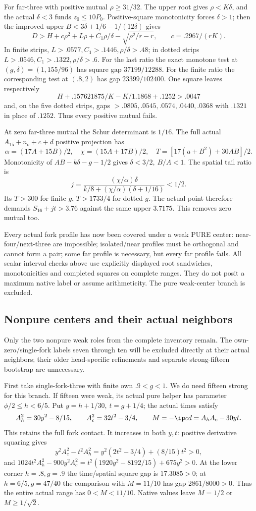 For far-three with positive mutual \(\rho\geq31/32\).
The upper root gives \(\rho<K\delta\), and the actual
\(\delta<3\) funds \(z_0\leq10P_0\).
Positive-square monotonicity forces \(\delta>1\);
then the improved upper
\(B<3\delta+1/6-1/(12\delta)\) gives
\[
 D>H+c\rho^2+L\rho+C_1\rho/\delta-\sqrt{\rho^2/r-r},
 \qquad c=.2967/(rK).
\]
In finite strips, \(L>.0577,C_1>.1446,\rho/\delta>.48\);
in dotted strips \(L>.0546,C_1>.1322,\rho/\delta>.6\).
For the last ratio the exact monotone test at
\((g,\delta)=(1,155/96)\) has square gap \(37199/12288\).
For the finite ratio the corresponding test at \((.8,2)\)
has gap \(23399/102400\).
One square leaves respectively
\[
 H+.157621875/K-K/1.1868+.1252>.0047
\]
and, on the five dotted strips, gaps
\(>.0805,.0545,.0574,.0440,.0368\) with \(.1321\)
in place of \(.1252\).
Thus every positive mutual fails.

At zero far-three mutual the Schur determinant is \(1/16\).
The full actual \(A_{15}+n_o+c+d\) positive projection has
\[
 \alpha=(17A+15B)/2,\quad \chi=(15A+17B)/2,\quad
 T=[17(a+B^2)+30AB]/2 .
\]
Monotonicity of \(AB-k\delta-g-1/2\) gives
\(\delta<3/2,\ B/A<1\).
The spatial tail ratio is
\[
 j=\frac{(\chi/\alpha)\delta}
          {k/8+(\chi/\alpha)(\delta+1/16)}<1/2 .
\]
Its \(T>300\) for finite \(g\), \(T>1733/4\) for dotted \(g\).
The actual point therefore demands \(S_{16}+jt>3.76\)
against the same upper \(3.7175\).
This removes zero mutual too.

Every actual fork profile has now been covered under a weak PURE
center: near-four/next-three are impossible; isolated/near profiles
must be orthogonal and cannot form a pair; some far profile is
necessary, but every far profile fails.
All scalar interval checks above use explicitly displayed root
sandwiches, monotonicities and completed squares on complete ranges.
They do not posit a maximum native label or assume arithmeticity.
The pure weak-center branch is excluded.

\subsection{Nonpure centers and their actual neighbors}
\label{app:D18nonpurecenter}
Only the two nonpure weak roles from the complete inventory remain.
The own-zero/single-fork labels seven through ten will be excluded
directly at their actual neighbors; their older head-specific
refinements and separate strong-fifteen bootstrap are unnecessary.

First take single-fork-three with finite own \(.9<g<1\).
We do need fifteen strong for this branch.
If fifteen were weak, its actual pure helper has parameter
\(\phi/2\leq h<6/5\). Put \(y=h+1/30,\ t=g+1/4\);
the actual times satisfy
\[
 A_h^2=30y^2-8/15,\qquad A_c^2=32t^2-3/4,
 \qquad M=-\ip cd=A_hA_c-30yt .
\]
This retains the full fork contact.
It increases in both \(y,t\): positive derivative squaring gives
\[
 y^2A_c^2-t^2A_h^2=y^2(2t^2-3/4)+(8/15)t^2>0,
\]
and
\(1024t^2A_h^2-900y^2A_c^2
=t^2(1920y^2-8192/15)+675y^2>0\).
At the lower corner \(h=.8,g=.9\) the time/spatial square
gap is \(17.3085>0\); at \(h=6/5,g=47/40\) the comparison
with \(M=11/10\) has gap \(2861/8000>0\).
Thus the entire actual range has \(0<M<11/10\).
Native values leave \(M=1/2\) or \(M\geq1/\sqrt2\).

